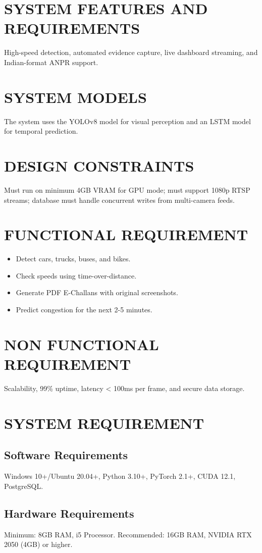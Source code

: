 \documentclass[12pt,times,a4paper]{report}
\begin{document}
\section{SYSTEM FEATURES AND REQUIREMENTS}
High-speed detection, automated evidence capture, live dashboard streaming, and Indian-format ANPR support.

\section{SYSTEM MODELS}
The system uses the YOLOv8 model for visual perception and an LSTM model for temporal prediction.

\section{DESIGN CONSTRAINTS}
Must run on minimum 4GB VRAM for GPU mode; must support 1080p RTSP streams; database must handle concurrent writes from multi-camera feeds.

\section{FUNCTIONAL REQUIREMENT}
\begin{itemize}
    \item Detect cars, trucks, buses, and bikes.
    \item Check speeds using time-over-distance.
    \item Generate PDF E-Challans with original screenshots.
    \item Predict congestion for the next 2-5 minutes.
\end{itemize}

\section{NON FUNCTIONAL REQUIREMENT}
Scalability, 99\% uptime, latency < 100ms per frame, and secure data storage.

\section{SYSTEM REQUIREMENT}
\subsection{Software Requirements}
Windows 10+/Ubuntu 20.04+, Python 3.10+, PyTorch 2.1+, CUDA 12.1, PostgreSQL.
\subsection{Hardware Requirements}
Minimum: 8GB RAM, i5 Processor. Recommended: 16GB RAM, NVIDIA RTX 2050 (4GB) or higher.
\end{document}
